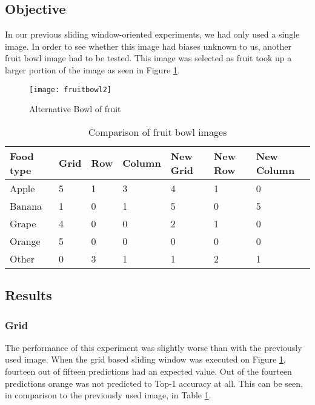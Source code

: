 \tocless\subsection{Objective}
In our previous sliding window-oriented experiments, we had only used a
single image. In order to see whether this image had biases unknown
to us, another fruit bowl image had to be tested. This image was selected as
fruit took up a larger portion of the image as seen in Figure \ref{fig:newFruit}.

\begin{figure}[h]
\centering
    \texttt{[image: fruitbowl2]}
    \caption{Alternative Bowl of fruit}
    \label{fig:newFruit}
\end{figure}

\begin{table}[]
    \centering
    \caption{Comparison of fruit bowl images}
    \label{newFruitTable}
    \begin{tabular}{|l|l|l|l|p{1.25cm}|p{1.25cm}|p{2cm}|}
    \hline
        \textbf{Food type} & \textbf{Grid} & \textbf{Row} & \textbf{Column} & \textbf{New Grid} & \textbf{New Row} & \textbf{New Column} \\ \hline
        Apple     & 5    & 1   & 3      & 4        & 1       & 0          \\ \hline
        Banana    & 1    & 0   & 1      & 5        & 0       & 5          \\ \hline
        Grape     & 4    & 0   & 0      & 2        & 1       & 0          \\ \hline
        Orange    & 5    & 0   & 0      & 0        & 0       & 0          \\ \hline
        Other     & 0    & 3   & 1      & 1        & 2       & 1         \\ \hline
    \end{tabular}
\end{table}

\tocless\subsection{Results}
\tocless\subsubsection{Grid}
The performance of this experiment was slightly worse than with the previously
used image. When the grid based sliding window was executed on Figure
\ref{fig:newFruit}, fourteen out of fifteen predictions had an expected value.
Out of the fourteen predictions orange was not predicted to Top-1 accuracy at
all. This can be seen, in comparison to the previously used image, in Table
\ref{newFruitTable}.

